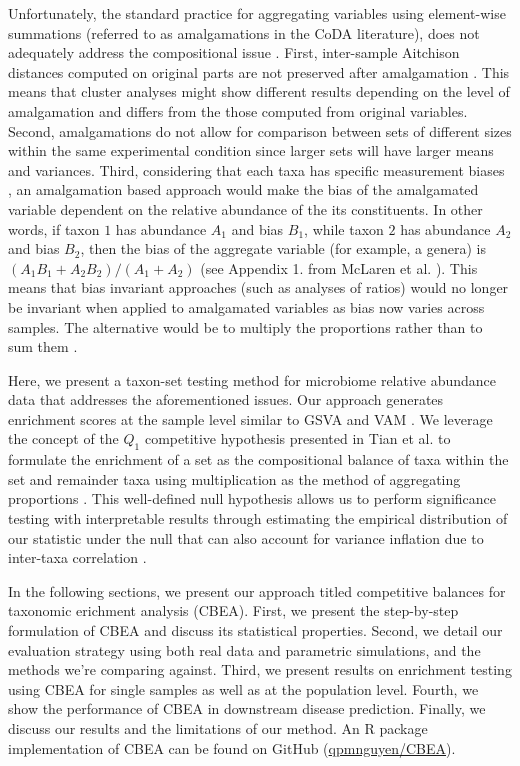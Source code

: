 \documentclass[10pt,letterpaper]{article}
\begin{document}
Unfortunately, the standard practice for aggregating variables using element-wise summations (referred to as amalgamations in the CoDA literature), does not adequately address the compositional issue \cite{mclaren2019}. First, inter-sample Aitchison distances computed on original parts are not preserved after amalgamation \cite{egozcue2005}. This means that cluster analyses might show different results depending on the level of amalgamation and differs from the those computed from original variables. Second, amalgamations do not allow for comparison between sets of different sizes within the same experimental condition since larger sets will have larger means and variances. Third, considering that each taxa has specific measurement biases \cite{mclaren2019}, an amalgamation based approach would make the bias of the amalgamated variable dependent on the relative abundance of the its constituents. In other words, if taxon $1$ has abundance $A_1$ and bias $B_1$, while taxon $2$ has abundance $A_2$ and bias $B_2$, then the bias of the aggregate variable (for example, a genera) is $(A_1B_1 + A_2B_2)/(A_1 + A_2)$ (see Appendix 1. from McLaren et al. \cite{mclaren2019}). This means that bias invariant approaches (such as analyses of ratios) would no longer be invariant when applied to amalgamated variables as bias now varies across samples. The alternative would be to multiply the proportions rather than to sum them \cite{egozcue2005}. 

Here, we present a taxon-set testing method for microbiome relative abundance data that addresses the aforementioned issues. Our approach generates enrichment scores at the sample level similar to GSVA \cite{hanzelmann2013} and VAM \cite{frost2020}. We leverage the concept of the $Q_1$ competitive hypothesis presented in Tian et al. \cite{tian2005} to formulate the enrichment of a set as the compositional balance \cite{rivera-pinto2018} of taxa within the set and remainder taxa using multiplication as the method of aggregating proportions \cite{egozcue2005}. This well-defined null hypothesis allows us to perform significance testing with interpretable results through estimating the empirical distribution of our statistic under the null that can also account for variance inflation due to inter-taxa correlation \cite{wu2012}. 

In the following sections, we present our approach titled competitive balances for taxonomic erichment analysis (CBEA). First, we present the step-by-step formulation of CBEA and discuss its statistical properties. Second, we detail our evaluation strategy using both real data and parametric simulations, and the methods we're comparing against. Third, we present results on enrichment testing using CBEA for single samples as well as at the population level. Fourth, we show the performance of CBEA in downstream disease prediction. Finally, we discuss our results and the limitations of our method. An R package implementation of CBEA can be found on GitHub (\href{www.github.com/qpmnguyen/teaR}{qpmnguyen/CBEA}).
\end{document}
